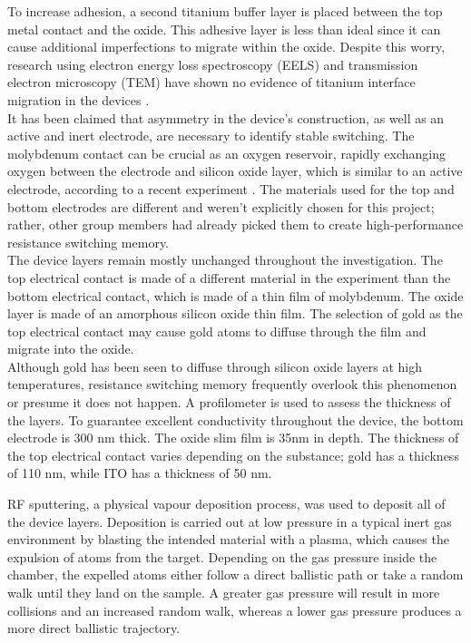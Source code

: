 \noindent To increase adhesion, a second titanium buffer layer is placed between the top metal contact and the oxide. This adhesive layer is less than ideal since it can cause additional imperfections to migrate within the oxide. Despite this worry, research using electron energy loss spectroscopy (EELS) and transmission electron microscopy (TEM) have shown no evidence of titanium interface migration in the devices \cite{mehonic2017intrinsic}. \\

\noindent It has been claimed that asymmetry in the device's construction, as well as an active and inert electrode, are necessary to identify stable switching. The molybdenum contact can be crucial as an oxygen reservoir, rapidly exchanging oxygen between the electrode and silicon oxide layer, which is similar to an active electrode, according to a recent experiment \cite{cox2021nanoscale}. The materials used for the top and bottom electrodes are different and weren't explicitly chosen for this project; rather, other group members had already picked them to create high-performance resistance switching memory. \\

\noindent The device layers remain mostly unchanged throughout the investigation. The top electrical contact is made of a different material in the experiment than the bottom electrical contact, which is made of a thin film of molybdenum. The oxide layer is made of an amorphous silicon oxide thin film. The selection of gold as the top electrical contact may cause gold atoms to diffuse through the film and migrate into the oxide. \\

\noindent Although gold has been seen to diffuse through silicon oxide layers at high temperatures, resistance switching memory frequently overlook this phenomenon or presume it does not happen. A profilometer is used to assess the thickness of the layers. To guarantee excellent conductivity throughout the device, the bottom electrode is 300 nm thick. The oxide slim film is 35nm in depth. The thickness of the top electrical contact varies depending on the substance; gold has a thickness of 110 nm, while ITO has a thickness of 50 nm.

RF sputtering, a physical vapour deposition process, was used to deposit all of the device layers. Deposition is carried out at low pressure in a typical inert gas environment by blasting the intended material with a plasma, which causes the expulsion of atoms from the target. Depending on the gas pressure inside the chamber, the expelled atoms either follow a direct ballistic path or take a random walk until they land on the sample. A greater gas pressure will result in more collisions and an increased random walk, whereas a lower gas pressure produces a more direct ballistic trajectory. \\


